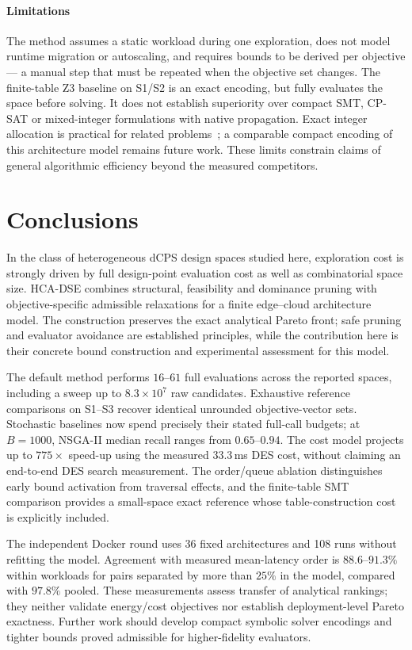 \documentclass[preprint,11pt,3p]{elsarticle}
\theoremstyle{plain}
\theoremstyle{definition}
\newcommand{\EvalRange}{16\text{--}61}
\newcommand{\DesCostMs}{33.3}
\newcommand{\ProjectionMax}{775}
\newcommand{\BaselineRecallRange}{0.65\text{--}0.94}
\newcommand{\WithinAgreementRange}{88.6\text{--}91.3}
\newcommand{\PooledAgreement}{97.8}
\begin{document}
\paragraph{Limitations}
The method assumes a static workload during one exploration, does not model runtime
migration or autoscaling, and requires bounds to be derived per objective --- a manual
step that must be repeated when the objective set changes. The finite-table Z3 baseline on S1/S2 is an exact encoding, but fully evaluates the space
before solving. It does not establish superiority over compact SMT, CP-SAT or mixed-integer
formulations with native propagation. Exact integer allocation is practical for related
problems~\cite{kouloumpris2024optimization,kouloumpris2026reliability}; a comparable
compact encoding of this architecture model remains future work. These limits constrain
claims of general algorithmic efficiency beyond the measured competitors.
\section{Conclusions}
\label{sec:conclusion}
In the class of heterogeneous dCPS design spaces studied here, exploration cost is
strongly driven by full design-point evaluation cost as well as combinatorial space size.
HCA-DSE combines structural, feasibility and dominance pruning with objective-specific
admissible relaxations for a finite edge--cloud architecture model. The construction
preserves the exact analytical Pareto front; safe pruning and evaluator avoidance are
established principles, while the contribution here is their concrete bound construction
and experimental assessment for this model.

The default method performs $\EvalRange$ full evaluations across the reported spaces,
including a sweep up to $8.3\times10^7$ raw candidates. Exhaustive reference comparisons
on S1--S3 recover identical unrounded objective-vector sets. Stochastic baselines now
spend precisely their stated full-call budgets; at $B=1000$, NSGA-II median recall ranges
from $\BaselineRecallRange$. The cost model projects up to $\ProjectionMax\times$
speed-up using the measured $\DesCostMs$\,ms DES cost, without claiming an end-to-end
DES search measurement. The order/queue ablation distinguishes early bound activation
from traversal effects, and the finite-table SMT comparison provides a small-space exact
reference whose table-construction cost is explicitly included.

The independent Docker round uses 36 fixed architectures and 108 runs without refitting
the model. Agreement with measured mean-latency order is $\WithinAgreementRange\%$
within workloads for pairs separated by more than $25\%$ in the model, compared with
$\PooledAgreement\%$ pooled. These measurements assess transfer of analytical rankings;
they neither validate energy/cost objectives nor establish deployment-level Pareto
exactness. Further work should develop compact symbolic solver encodings and tighter
bounds proved admissible for higher-fidelity evaluators.
\end{document}
